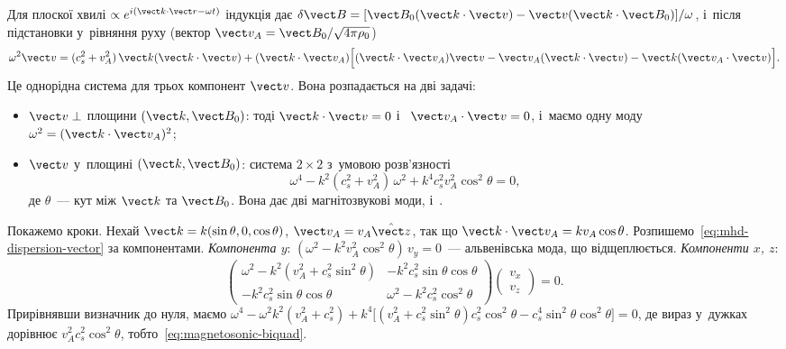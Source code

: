 Для плоскої хвилі $\propto e^{i(\vect k\cdot\vect r-\omega t)}$ індукція дає
$\delta\vect B=[\vect B_0(\vect k\cdot\vect v)-\vect v(\vect k\cdot\vect B_0)]/\omega$, і~після
підстановки у~рівняння руху (вектор $\vect v_A=\vect B_0/\sqrt{4\pi\rho_0}$)
\begin{equation}\label{eq:mhd-dispersion-vector}
\omega^2\vect v=(c_s^2+v_A^2)\,\vect k(\vect k\cdot\vect v)
+(\vect k\cdot\vect v_A)\Bigl[(\vect k\cdot\vect v_A)\vect v-\vect v_A(\vect k\cdot\vect v)-\vect k(\vect v_A\cdot\vect v)\Bigr].
\end{equation}
Це однорідна система для трьох компонент $\vect v$. Вона розпадається на дві задачі:
\begin{itemize}
	\item $\vect v\perp$ площини $(\vect k,\vect B_0)$: тоді $\vect k\cdot\vect v=0$ і~
	  $\vect v_A\cdot\vect v=0$, і~маємо одну моду 
	  $\omega^2=(\vect k\cdot\vect v_A)^2$;
	\item $\vect v$ у~площині $(\vect k,\vect B_0)$: система $2\times2$ з~умовою розв'язності
	  \begin{equation}\label{eq:magnetosonic-biquad}
	  \omega^4-k^2(c_s^2+v_A^2)\,\omega^2+k^4c_s^2v_A^2\cos^2\theta=0,
	  \end{equation}
	  де $\theta$~--- кут між $\vect k$ та $\vect B_0$. Вона дає дві магнітозвукові моди,
	   і~.
\end{itemize}
Покажемо кроки. Нехай $\vect k=k(\sin\theta,0,\cos\theta)$, $\vect v_A=v_A\hat{\vect z}$, так що
$\vect k\cdot\vect v_A=kv_A\cos\theta$. Розпишемо~\eqref{eq:mhd-dispersion-vector} за компонентами.
\emph{Компонента $y$}: $(\omega^2-k^2v_A^2\cos^2\theta)\,v_y=0$~--- альвенівська мода, що відщеплюється.
\emph{Компоненти $x$, $z$}:
\[\begin{pmatrix}\omega^2-k^2(v_A^2+c_s^2\sin^2\theta)&-k^2c_s^2\sin\theta\cos\theta\\
-k^2c_s^2\sin\theta\cos\theta&\omega^2-k^2c_s^2\cos^2\theta\end{pmatrix}
\begin{pmatrix}v_x\\v_z\end{pmatrix}=0.\]
Прирівнявши визначник до нуля, маємо
$\omega^4-\omega^2k^2(v_A^2+c_s^2)+k^4\bigl[(v_A^2+c_s^2\sin^2\theta)c_s^2\cos^2\theta-c_s^4\sin^2\theta\cos^2\theta\bigr]=0$,
де вираз у~дужках дорівнює $v_A^2c_s^2\cos^2\theta$, тобто~\eqref{eq:magnetosonic-biquad}.

